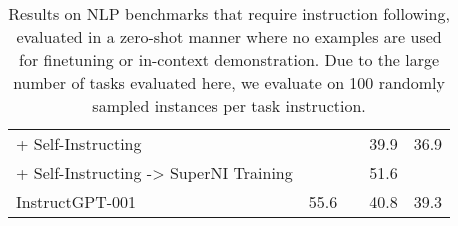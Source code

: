 \begin{table*}[]
\begin{tabular}{lcccc}
+ Self-Instructing                                  &                &                & 39.9           &         36.9       \\
+ Self-Instructing -> SuperNI Training            &                  &                  &   51.6               &                 \\
\addlinespace
InstructGPT-001                                   &   55.6             &                & 40.8            &     39.3            \\ \bottomrule
\end{tabular}
\caption{Results on NLP benchmarks that require instruction following, evaluated in a zero-shot manner where no examples are used for finetuning or in-context demonstration. Due to the large number of tasks evaluated here, we evaluate on 100 randomly sampled instances per task instruction.}
\label{tab:benchmark-results}
\end{table*}